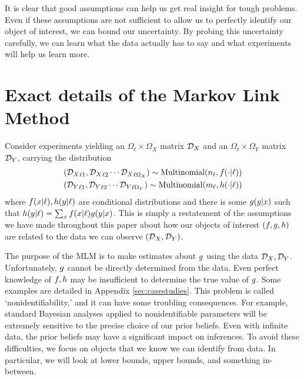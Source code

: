 It is clear that good assumptions can help us get real insight for tough problems. Even if these assumptions are not sufficient to allow us to perfectly identify our object of interest, we can bound our uncertainty.  By probing this uncertainty carefully, we can learn what the data actually has to say and what experiments will help us learn more.




\appendix


%

\section{Exact details of the Markov Link Method}

\label{sec:mlmdetails}
 
Consider experiments yielding an $\Omega_\ell\times\Omega_X$ matrix ${\mathcal{D}_X}$ and an $\Omega_\ell \times \Omega_Y$ matrix ${\mathcal{D}_Y}$, carrying the distribution
\begin{align*}
({\mathcal{D}_X}_{\ell 1},{\mathcal{D}_X}_{\ell 2}\cdots {\mathcal{D}_X}_{\ell \Omega_X}) \sim \mathrm{Multinomial}(n_\ell,f(\cdot | \ell))\\
({\mathcal{D}_Y}_{\ell 1},{\mathcal{D}_Y}_{\ell 2}\cdots {\mathcal{D}_Y}_{\ell \Omega_Y}) \sim \mathrm{Multinomial}(m_\ell,h(\cdot | \ell))
\end{align*}
where $f(x|\ell),h(y|\ell)$ are conditional distributions and there is some $g(y|x)$ such that $h(y|\ell)=\sum_x f(x|\ell)g(y|x)$.  This is simply a restatement of the assumptions we have made throughout this paper about how our objects of interest $(f,g,h)$ are related to the data we can observe $({\mathcal{D}_X},{\mathcal{D}_Y})$.

The purpose of the MLM is to make estimates about $g$ using the data ${\mathcal{D}_X},{\mathcal{D}_Y}$.  Unfortunately, $g$ cannot be directly determined from the data.  Even perfect knowledge of $f,h$ may be insufficient to determine the true value of $g$.  Some examples are detailed in Appendix \ref{sec:casestudies}.  This problem is called `nonidentifiability,' and it can have some troubling consequences.  For example, standard Bayesian analyses applied to nonidentifiable parameters will be extremely sensitive to the precise choice of our prior beliefs.  Even with infinite data, the prior beliefs may have a significant impact on inferences.  To avoid these difficulties, we focus on objects that we know we can identify from data.  In particular, we will look at lower bounds, upper bounds, and something in-between.

